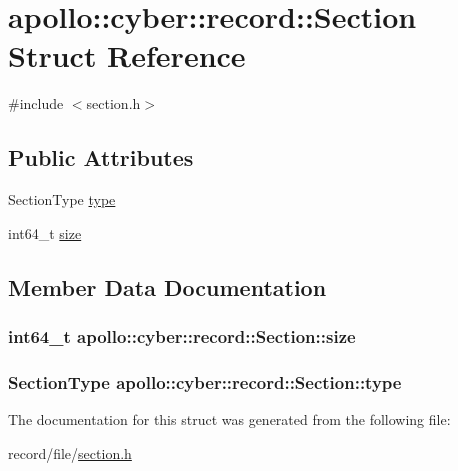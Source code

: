 \hypertarget{structapollo_1_1cyber_1_1record_1_1Section}{\section{apollo\-:\-:cyber\-:\-:record\-:\-:Section Struct Reference}
\label{structapollo_1_1cyber_1_1record_1_1Section}
}


{\ttfamily \#include $<$section.\-h$>$}

\subsection*{Public Attributes}
\begin{DoxyCompactItemize}
\item 
Section\-Type \hyperlink{structapollo_1_1cyber_1_1record_1_1Section_a898ee2af10b4939bf3988fecca811487}{type}
\item 
int64\-\_\-t \hyperlink{structapollo_1_1cyber_1_1record_1_1Section_a3a3fe2e82abe80a8f9e6cee9d5ca14e2}{size}
\end{DoxyCompactItemize}


\subsection{Member Data Documentation}
\hypertarget{structapollo_1_1cyber_1_1record_1_1Section_a3a3fe2e82abe80a8f9e6cee9d5ca14e2}{
\subsubsection[{size}]{\setlength{\rightskip}{0pt plus 5cm}int64\-\_\-t apollo\-::cyber\-::record\-::\-Section\-::size}}\label{structapollo_1_1cyber_1_1record_1_1Section_a3a3fe2e82abe80a8f9e6cee9d5ca14e2}
\hypertarget{structapollo_1_1cyber_1_1record_1_1Section_a898ee2af10b4939bf3988fecca811487}{
\subsubsection[{type}]{\setlength{\rightskip}{0pt plus 5cm}Section\-Type apollo\-::cyber\-::record\-::\-Section\-::type}}\label{structapollo_1_1cyber_1_1record_1_1Section_a898ee2af10b4939bf3988fecca811487}


The documentation for this struct was generated from the following file\-:\begin{DoxyCompactItemize}
\item 
record/file/\hyperlink{section_8h}{section.\-h}\end{DoxyCompactItemize}
